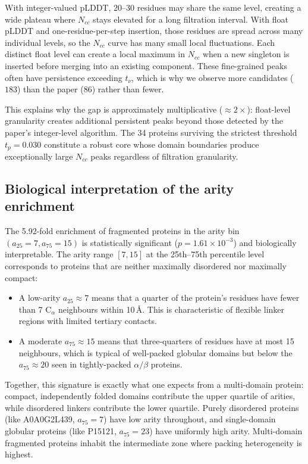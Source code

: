 With integer-valued pLDDT, 20--30 residues may share the same level,
creating a wide plateau where $N_{cc}$ stays elevated for a long
filtration interval.
With float pLDDT and one-residue-per-step insertion, those residues are
spread across many individual levels, so the $N_{cc}$ curve has many
small local fluctuations.
Each distinct float level can create a local maximum in $N_{cc}$ when
a new singleton is inserted before merging into an existing component.
These fine-grained peaks often have persistence exceeding $t_\nu$, which
is why we observe more candidates ($183$) than the paper ($86$) rather
than fewer.

This explains why the gap is approximately multiplicative (${\approx}2\times$):
float-level granularity creates additional persistent peaks beyond those
detected by the paper's integer-level algorithm.
The 34 proteins surviving the strictest threshold $t_p = 0.030$ constitute
a robust core whose domain boundaries produce exceptionally large $N_{cc}$
peaks regardless of filtration granularity.

\subsection{Biological interpretation of the arity enrichment}
\label{sec:disc_arity}

The 5.92-fold enrichment of fragmented proteins in the arity bin
$(a_{25}=7, a_{75}=15)$ is statistically significant
($p = 1.61 \times 10^{-3}$) and biologically interpretable.
The arity range $[7, 15]$ at the 25th--75th percentile level corresponds
to proteins that are neither maximally disordered nor maximally compact:

\begin{itemize}
  \item A low-arity $a_{25} \approx 7$ means that a quarter of the
  protein's residues have fewer than 7 $\mathrm{C}_\alpha$ neighbours
  within 10\,\AA{}.
  This is characteristic of flexible linker regions with limited
  tertiary contacts.

  \item A moderate $a_{75} \approx 15$ means that three-quarters of
  residues have at most 15 neighbours, which is typical of well-packed
  globular domains but below the $a_{75} \approx 20$ seen in
  tightly-packed $\alpha/\beta$ proteins.
\end{itemize}

Together, this signature is exactly what one expects from a multi-domain
protein: compact, independently folded domains contribute the upper
quartile of arities, while disordered linkers contribute the lower
quartile.
Purely disordered proteins (like A0A0G2L439, $a_{75}=7$) have low arity
throughout, and single-domain globular proteins (like P15121, $a_{75}=23$)
have uniformly high arity.
Multi-domain fragmented proteins inhabit the intermediate zone where
packing heterogeneity is highest.

